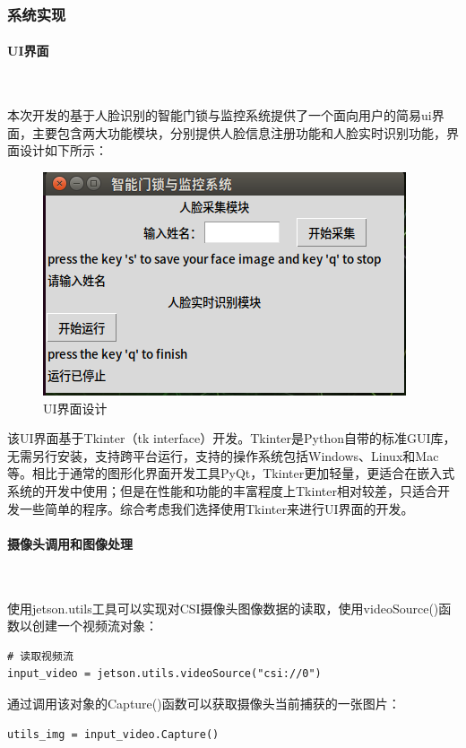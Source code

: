 \documentclass[UTF8]{article}
\begin{document}
\subsubsection{系统实现} 
\paragraph{UI界面}~{}

本次开发的基于人脸识别的智能门锁与监控系统提供了一个面向用户的简易ui界面，主要包含两大功能模块，分别提供人脸信息注册功能和人脸实时识别功能，界面设计如下所示：
\begin{figure}[H]
    \centering %
    \includegraphics[width=.6\textwidth]{figure/ui界面.png} 
    \caption{UI界面设计} %
\end{figure}

该UI界面基于Tkinter（tk interface）开发。Tkinter是Python自带的标准GUI库，无需另行安装，支持跨平台运行，支持的操作系统包括Windows、Linux和Mac等。相比于通常的图形化界面开发工具PyQt，Tkinter更加轻量，更适合在嵌入式系统的开发中使用；但是在性能和功能的丰富程度上Tkinter相对较差，只适合开发一些简单的程序。综合考虑我们选择使用Tkinter来进行UI界面的开发。



\paragraph{摄像头调用和图像处理}~{}

使用jetson.utils工具可以实现对CSI摄像头图像数据的读取，使用videoSource()函数以创建一个视频流对象：
\begin{lstlisting}
# 读取视频流
input_video = jetson.utils.videoSource("csi://0") 
\end{lstlisting}

通过调用该对象的Capture()函数可以获取摄像头当前捕获的一张图片：
\begin{lstlisting}
utils_img = input_video.Capture()
\end{lstlisting}
\end{document}
